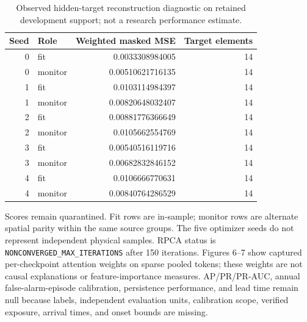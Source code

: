 \begin{table}[ht]
\centering
\caption{Observed hidden-target reconstruction diagnostic on retained development support; not a research performance estimate.}
\begin{tabular}{r l r r}
\hline
Seed & Role & Weighted masked MSE & Target elements \\
\hline
0 & fit & 0.0033308984005 & 14 \\
0 & monitor & 0.00510621716135 & 14 \\
1 & fit & 0.0103114984397 & 14 \\
1 & monitor & 0.00820648032407 & 14 \\
2 & fit & 0.00881776366649 & 14 \\
2 & monitor & 0.0105662554769 & 14 \\
3 & fit & 0.00540516119716 & 14 \\
3 & monitor & 0.00682832846152 & 14 \\
4 & fit & 0.0106666770631 & 14 \\
4 & monitor & 0.00840764286529 & 14 \\
\hline
\end{tabular}
\label{tab:wp09-score-a-diagnostic}
\end{table}
\noindent Scores remain quarantined. Fit rows are in-sample; monitor rows are alternate spatial parity within the same source groups. The five optimizer seeds do not represent independent physical samples. RPCA status is \texttt{NONCONVERGED\_MAX\_ITERATIONS} after 150 iterations. Figures 6–7 show captured per-checkpoint attention weights on sparse pooled tokens; these weights are not causal explanations or feature-importance measures. AP/PR/PR-AUC, annual false-alarm-episode calibration, persistence performance, and lead time remain null because labels, independent evaluation units, calibration scope, verified exposure, arrival times, and onset bounds are missing.\par
